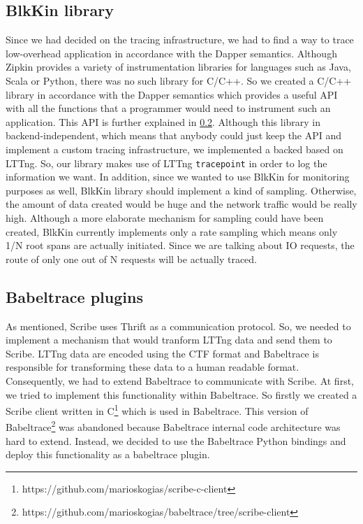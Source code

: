 \subsection{BlkKin library}
Since we had decided on the tracing infrastructure, we had to find a way to
trace low-overhead application in accordance with the Dapper semantics. Although
Zipkin provides a variety of instrumentation libraries for languages such as
Java, Scala or Python, there was no such library for C/C++. So we created a
C/C++ library in accordance with the Dapper semantics which provides a useful
API with all the functions that a programmer would need to instrument such an
application. This API is further explained in \ref{}. Although this library in
backend-independent, which means that anybody could just keep the API and
implement a custom tracing infrastructure, we implemented a backed based on
LTTng. So, our library makes use of LTTng \texttt{tracepoint} in order to log
the information we want. In addition, since we wanted to use BlkKin for
monitoring purposes as well, BlkKin library should implement a kind of sampling.
Otherwise, the amount of data created would be huge and the network traffic
would be really high. Although a more elaborate mechanism for sampling could
have been created, BlkKin currently implements only a rate sampling which means
only 1/N root spans are actually initiated. Since we are talking about IO
requests, the route of only one out of N requests will be actually traced.

\subsection{Babeltrace plugins}
As mentioned, Scribe uses Thrift as a communication protocol. So, we needed to
implement a mechanism that would tranform LTTng data and send them to Scribe.
LTTng data are encoded using the CTF format and Babeltrace is responsible for
transforming these data to a human readable format. Consequently, we had to
extend Babeltrace to communicate with Scribe. At first, we tried to implement
this functionality within Babeltrace. So firstly we created a Scribe client
written in C\footnote{https://github.com/marioskogias/scribe-c-client} which is
used in Babeltrace. This version of
Babeltrace\footnote{https://github.com/marioskogias/babeltrace/tree/scribe-client}
was abandoned because Babeltrace internal code architecture was hard to extend.
Instead, we decided to use the Babeltrace Python bindings and deploy this
functionality as a babeltrace plugin. 

